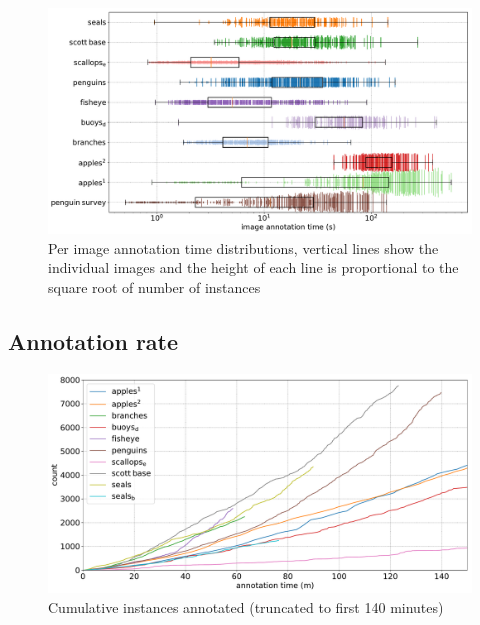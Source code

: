 \begin{figure}[ht]
\centering
\includegraphics[width=1.0\linewidth]{charts/summaries/duration_boxplot.pdf}
\caption{ Per image annotation time distributions, vertical lines show the individual images and the height of each line is proportional to the square root of number of instances }
\label{fig:duration_boxplot}
\end{figure}




\subsection{Annotation rate}
\label{sec:annotation_rate}

\begin{figure}[H]
\centering
\includegraphics[width=1.0\linewidth]{charts/summaries/cumulative_instances_crop.pdf}
\caption{ Cumulative instances annotated (truncated to first 140 minutes)  }
\label{fig:cumulative_instances}
\end{figure}

